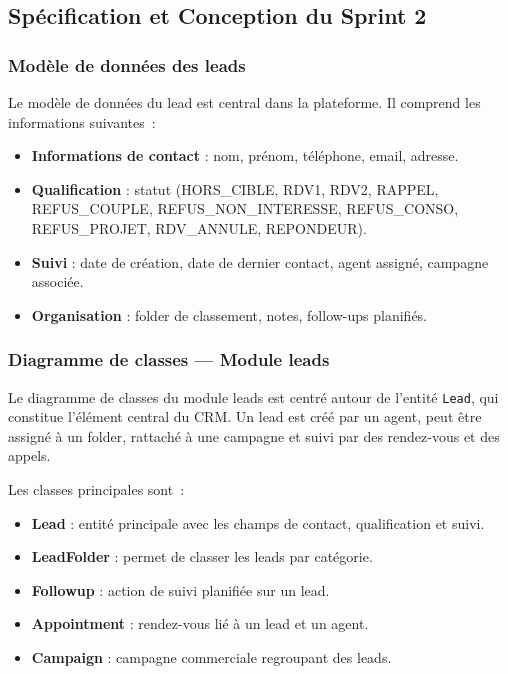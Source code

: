 \subsection{Spécification et Conception du Sprint 2}
\label{subsec:sprint2_spec}

\subsubsection{Modèle de données des leads}

Le modèle de données du lead est central dans la plateforme. Il comprend les informations
suivantes~:

\begin{itemize}
    \item \textbf{Informations de contact} : nom, prénom, téléphone, email, adresse.
    \item \textbf{Qualification} : statut (HORS_CIBLE, RDV1, RDV2, RAPPEL, REFUS_COUPLE,
    REFUS_NON_INTERESSE, REFUS_CONSO, REFUS_PROJET, RDV_ANNULE, REPONDEUR).
    \item \textbf{Suivi} : date de création, date de dernier contact, agent assigné,
    campagne associée.
    \item \textbf{Organisation} : folder de classement, notes, follow-ups planifiés.
\end{itemize}

\subsubsection{Diagramme de classes — Module leads}

Le diagramme de classes du module leads est centré autour de l'entité \texttt{Lead}, qui
constitue l'élément central du CRM. Un lead est créé par un agent, peut être assigné à un
folder, rattaché à une campagne et suivi par des rendez-vous et des appels.

Les classes principales sont~:

\begin{itemize}
    \item \textbf{Lead} : entité principale avec les champs de contact, qualification et suivi.
    \item \textbf{LeadFolder} : permet de classer les leads par catégorie.
    \item \textbf{Followup} : action de suivi planifiée sur un lead.
    \item \textbf{Appointment} : rendez-vous lié à un lead et un agent.
    \item \textbf{Campaign} : campagne commerciale regroupant des leads.
\end{itemize}

